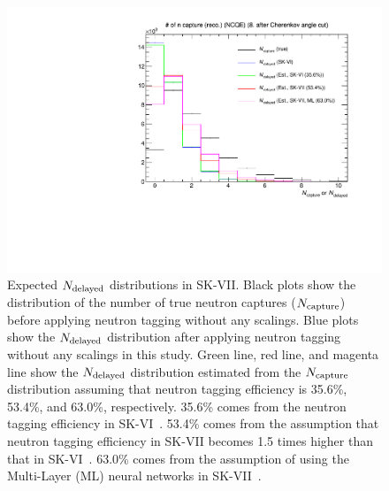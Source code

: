 \begin{figure}[h]
	\centering
	\includegraphics[width=12cm]{PDF/Future/Future_Nmulti}
	\caption[Expected $N_{\rm delayed}$ distributions in SK-VII]{
	Expected $N_{\rm delayed}$ distributions in SK-VII.
	Black plots show the distribution of the number of true neutron captures ($N_{\rm capture}$) before applying neutron tagging without any scalings.
	Blue plots show the $N_{\rm delayed}$ distribution after applying neutron tagging without any scalings in this study.
	Green line, red line, and magenta line show the $N_{\rm delayed}$ distribution estimated from the $N_{\rm capture}$ distribution assuming that neutron tagging efficiency is 35.6\%, 53.4\%, and 63.0\%, respectively.
	35.6\% comes from the neutron tagging efficiency in SK-VI~\cite{2023Harada,2022Harada}.
	53.4\% comes from the assumption that neutron tagging efficiency in SK-VII becomes 1.5 times higher than that in SK-VI~\cite{2023KanemuraSlide}.
	63.0\% comes from the assumption of using the Multi-Layer (ML) neural networks in SK-VII~\cite{2023KanemuraSlide}.
	}\label{Future_Nmulti}
\end{figure}

